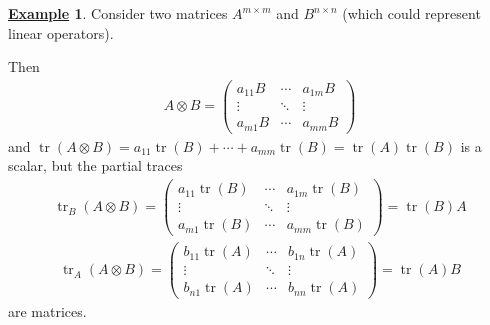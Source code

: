 \documentclass[11pt, answers]{exam}
\newcommand{\x}{\times}
\theoremstyle{definition}
\newtheorem{example}{\underline{Example}}[section]
\theoremstyle{bulleted}
\begin{document}
	\begin{example}
		Consider two matrices $A^{m\x m}$ and $B^{n\x n}$ (which could represent linear operators).
		
		Then
		\begin{align*}
			A\otimes B =
			\begin{pmatrix}
				a_{11} B & \cdots & a_{1m} B \\
				\vdots & \ddots & \vdots \\
				a_{m1} B & \cdots & a_{mm} B
			\end{pmatrix}
		\end{align*}
		and $\operatorname{tr}(A\otimes B) = a_{11}\operatorname{tr}(B) + \cdots + a_{mm}\operatorname{tr}(B)=\operatorname{tr}(A)\operatorname{tr}(B)$ is a scalar, but the partial traces
		\begin{align*}
			\operatorname{tr}_B(A\otimes B) = 
			\begin{pmatrix}
				a_{11} \operatorname{tr}(B) & \cdots & a_{1m} \operatorname{tr}(B) \\
				\vdots & \ddots & \vdots \\
				a_{m1} \operatorname{tr}(B) & \cdots & a_{mm} \operatorname{tr}(B)
			\end{pmatrix} = \operatorname{tr}(B) A
		\end{align*}
		\begin{align*}
			\operatorname{tr}_A(A\otimes B) =
			\begin{pmatrix}
				b_{11} \operatorname{tr}(A) & \cdots & b_{1n} \operatorname{tr}(A) \\
				\vdots & \ddots & \vdots \\
				b_{n1} \operatorname{tr}(A) & \cdots & b_{nn} \operatorname{tr}(A)
			\end{pmatrix}
			=\operatorname{tr}(A) B
		\end{align*}
		are matrices.
	\end{example}
	
\end{document}
